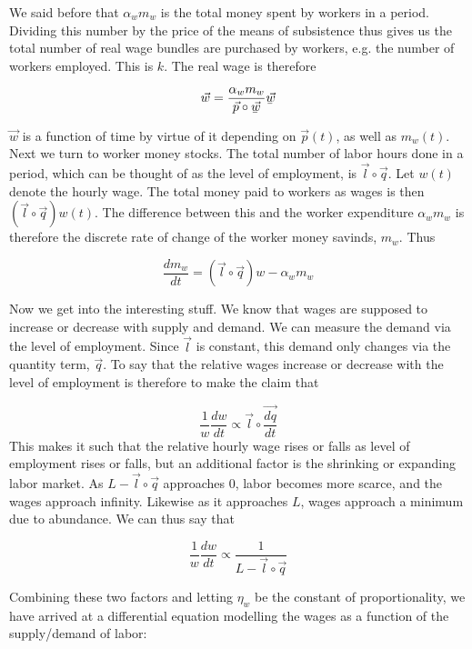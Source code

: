 \documentclass{article}
\newcommand{\ubar}[1]{\underaccent{\bar}{#1}}
\theoremstyle{definition}
\begin{document}
We said before that $\alpha_wm_w$ is the total money spent by workers in a period. Dividing this number by the price of the means of subsistence thus gives us the total number of real wage bundles are purchased by workers, e.g. the number of workers employed. This is $k$. The real wage is therefore 

\[ \vec{w} = \frac{\alpha_wm_w}{\vec{p}\circ\vec{\ubar{w}}}\vec{\ubar{w}} \]

$\vec{w}$ is a function of time by virtue of it depending on $\vec{p}(t)$, as well as $m_w(t)$. Next we turn to worker money stocks. The total number of labor hours done in a period, which can be thought of as the level of employment, is $\vec{l}\circ\vec{q}$. Let $w(t)$ denote the hourly wage. The total money paid to workers as wages is then $(\vec{l}\circ\vec{q})w(t)$. The difference between this and the worker expenditure $\alpha_wm_w$ is therefore the discrete rate of change of the worker money savinds, $m_w$. Thus

\begin{equation}
    \frac{dm_w}{dt} = (\vec{l}\circ\vec{q})w - \alpha_wm_w \label{change-in-worker-savings}
\end{equation}

Now we get into the interesting stuff. We know that wages are supposed to increase or decrease with supply and demand. We can measure the demand via the level of employment. Since $\vec{l}$ is constant, this demand only changes via the quantity term, $\vec{q}$. To say that the relative wages increase or decrease with the level of employment is therefore to make the claim that 

\[ \frac{1}{w}\frac{dw}{dt} \propto \vec{l}\circ \vec{\frac{dq}{dt}} \]
This makes it such that the relative hourly wage rises or falls as level of employment rises or falls, but an additional factor is the shrinking or expanding labor market. As $L-\vec{l}\circ\vec{q}$ approaches $0$, labor becomes more scarce, and the wages approach infinity. Likewise as it approaches $L$, wages approach a minimum due to abundance. We can thus say that 

\begin{equation}
    \frac{1}{w}\frac{dw}{dt} \propto \frac{1}{L-\vec{l}\circ\vec{q}}
\end{equation}

Combining these two factors and letting $\eta_w$ be the constant of proportionality, we have arrived at a differential equation modelling the wages as a function of the supply/demand of labor:
\end{document}
